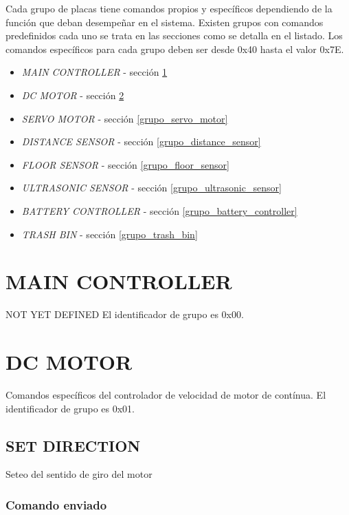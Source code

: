 \documentclass[a4paper,10pt]{article}
\begin{document}
Cada grupo de placas tiene comandos propios y espec\'ificos dependiendo de la funci\'on que deban desempe\~nar en el sistema.
Existen grupos con comandos predefinidos cada uno se trata en las secciones como se detalla en el listado.
Los comandos espec\'ificos para cada grupo deben ser desde 0x40 hasta el valor 0x7E.

\begin{itemize}
	\item \emph{MAIN CONTROLLER} - secci\'on \ref{grupo_main_controller}
	\item \emph{DC MOTOR} - secci\'on \ref{grupo_dc_motor}
	\item \emph{SERVO MOTOR} - secci\'on \ref{grupo_servo_motor}
	\item \emph{DISTANCE SENSOR} - secci\'on \ref{grupo_distance_sensor}
	\item \emph{FLOOR SENSOR} - secci\'on \ref{grupo_floor_sensor}
	\item \emph{ULTRASONIC SENSOR} - secci\'on \ref{grupo_ultrasonic_sensor}
	\item \emph{BATTERY CONTROLLER} - secci\'on \ref{grupo_battery_controller}
	\item \emph{TRASH BIN} - secci\'on \ref{grupo_trash_bin}
\label{grupos_listado}
\end{itemize}

\section{MAIN CONTROLLER}
\label{grupo_main_controller}

NOT YET DEFINED
El identificador de grupo es 0x00.

\section{DC MOTOR}
\label{grupo_dc_motor}

Comandos espec\'ificos del controlador de velocidad de motor de cont\'inua.
El identificador de grupo es 0x01.

\subsection{SET DIRECTION}
\label{set_direction}

Seteo del sentido de giro del motor

\subsubsection*{Comando enviado}
\end{document}
